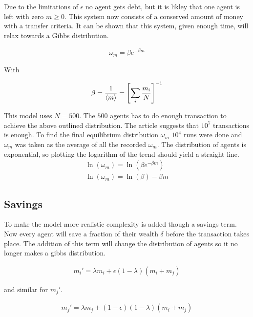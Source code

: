 Due to the limitations of $\epsilon$ no agent gets debt, but it is likley that one agent is left with zero $m\geq0$. This system now consists of a conserved amount of money with a transfer criteria. It can be shown that this system, given enough time, will relax towards a Gibbs distribution.\cite{proofgibbsdist}

\begin{align}
	\omega_m=\beta e^{-\beta m}
\end{align}

With

\begin{align}
	\beta=\frac{1}{\langle m\rangle}=\qty[\sum_i\frac{m_i}{N}]^{-1}\label{eq:beta}
\end{align}

This model uses $N=500$. The $500$ agents has to do enough transaction to achieve the above outlined distribution. The article suggests that $10^7$ transactions is enough. \cite{patriarca} To find the final equilibrium distribution $\omega_m$ $10^4$ runs were done and $\omega_m$ was taken as the average of all the recorded $\omega_m$. The distribution of agents is exponential, so plotting the logarithm of the trend should yield a straight line.
\begin{align*}
	\ln(\omega_m)=\ln(\beta e^{-\beta m})\\
	\ln(\omega_m)=\ln(\beta)-\beta m %
\end{align*}


\subsection{Savings}
\label{sec:savings}

To make the model more realistic complexity is added though a savings term. Now every agent will save a fraction of their wealth $\delta$ before the transaction takes place. The addition of this term will change the distribution of agents so it no longer makes a gibbs distribution.

\begin{align}
	m_i'=\lambda m_i+\epsilon(1-\lambda)(m_i+m_j)\label{savingsterm1}
\end{align}

and similar for $m_j'$.
 
 \begin{align}
	 m_j'=\lambda m_j+(1-\epsilon)(1-\lambda)(m_i+m_j) \label{savingsterm2}
 \end{align}
 
